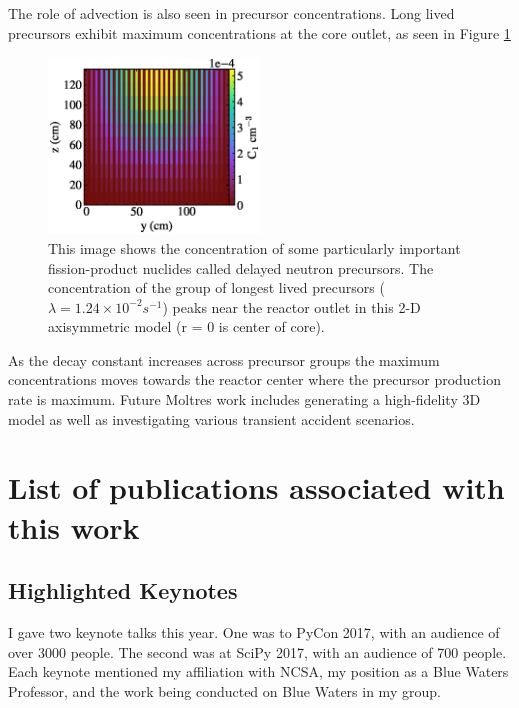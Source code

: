 \documentclass[letterpaper]{article}
\begin{document}
The role of advection is also seen in precursor
concentrations. Long lived precursors exhibit maximum concentrations at the
core outlet, as seen in Figure \ref{fig:pre1}


\begin{figure}[htb]
        \begin{center}
                \includegraphics[width=0.5\textwidth]{pre1.eps}
        \end{center}
        \caption{This image shows the concentration of some particularly 
        important fission-product nuclides called delayed neutron precursors.  
        The concentration of the group of longest lived precursors ($\lambda = 
        1.24\times{10}^{-2}{s}^{-1}$) peaks near the reactor outlet in this 2-D 
        axisymmetric model (r = 0 is center of core).} 
        \label{fig:pre1}
\end{figure}

As the decay constant increases across precursor groups the maximum
concentrations moves towards the reactor center where the precursor production
rate is maximum. Future Moltres work includes generating a high-fidelity 3D
model as well as investigating various transient accident scenarios.
\FloatBarrier

\section{List of publications associated with this work}




\subsection{Highlighted Keynotes} I gave two keynote talks 
this year. One was to PyCon 2017, with an audience of over 3000 people. The 
second was at SciPy 2017, with an audience of 700 people. Each keynote 
mentioned my affiliation with NCSA, my position as a Blue Waters Professor, and 
the work being conducted on Blue Waters in my group. 
\end{document}
